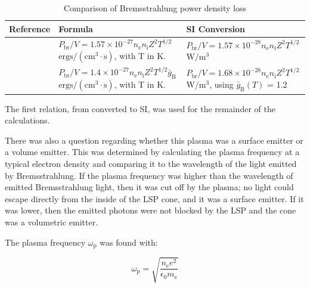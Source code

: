         \begin{table}[!ht]
            \footnotesize
            \centering
            \caption{Comparison of Bremsstrahlung power density loss}
            \label{tab:Brems_compare}
            \begin{tabularx}{\textwidth}{@{}lX<{\raggedright}@{}X<{\raggedright}@{}}
            \toprule
            Reference & Formula & SI Conversion \\ \midrule
            \textcite{glasstoneControlledThermonuclearReactions1975}  & $P_\mathrm{br}/V = 1.57 \times 10^{-27} n_\mathrm{e} n_\mathrm{i} Z^2 T^{1/2}$ \: $\mathrm{ergs/(cm^3\cdot s)}$, with T in K. &   $P_\mathrm{br}/V = 1.57 \times 10^{-28} n_\mathrm{e} n_\mathrm{i} Z^2 T^{1/2}$ \: $\mathrm{W/m^3}$  \\
            \textcite{rybickiRadiativeProcessesAstrophysics2004}      & $P_\mathrm{br}/V = 1.4 \times 10^{-27} n_\mathrm{e} n_\mathrm{i} Z^2 T^{1/2} \bar{g}_\mathrm{B}$ \: $\mathrm{ergs/(cm^3\cdot s)}$, with T in K.&  $P_\mathrm{br}/V = 1.68 \times 10^{-28} n_\mathrm{e} n_\mathrm{i} Z^2 T^{1/2}$ \:  $\mathrm{W/m^3}$, using $\bar{g}_\mathrm{B} (T)$ = 1.2\\
            \bottomrule          
            \end{tabularx}
        \end{table}

        The first relation, from \textcite{glasstoneControlledThermonuclearReactions1975} converted to SI, was used for the remainder of the calculations.

        There was also a question regarding whether this plasma was a surface emitter or a volume emitter. This was determined by calculating the plasma frequency at a typical electron density and comparing it to the wavelength of the light emitted by Bremsstrahlung. If the plasma frequency was higher than the wavelength of emitted Bremsstrahlung light, then it was cut off by the plasma; no light could escape directly from the inside of the LSP cone, and it was a surface emitter. If it was lower, then the emitted photons were not blocked by the LSP and the cone was a volumetric emitter.
        
        The plasma frequency $\omega_\mathrm{p}$ was found with: 

        \begin{equation}
            \omega_\mathrm{p} = \sqrt{\frac{n_\mathrm{e} e^2}{\epsilon_\mathrm{0} m_\mathrm{e}}}
        \end{equation}

